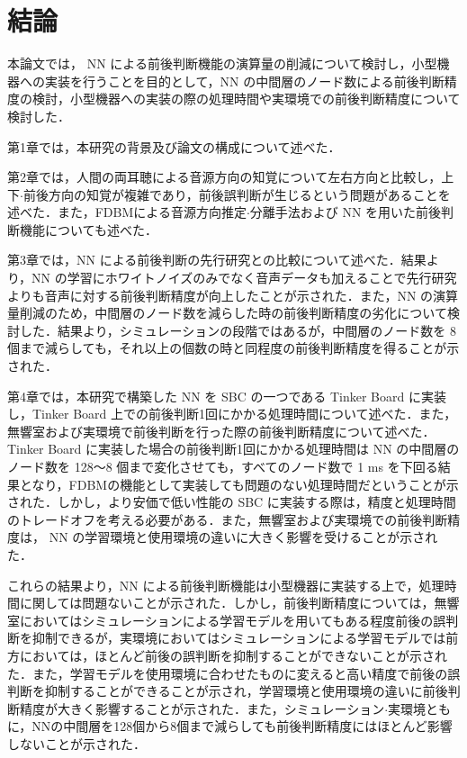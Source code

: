 ﻿\chapter{結論} \label{sec:conclusion}
本論文では， NN による前後判断機能の演算量の削減について検討し，小型機器への実装を行うことを目的として，NN の中間層のノード数による前後判断精度の検討，小型機器への実装の際の処理時間や実環境での前後判断精度について検討した．

第1章では，本研究の背景及び論文の構成について述べた．

第2章では，人間の両耳聴による音源方向の知覚について左右方向と比較し，上下$\cdot$前後方向の知覚が複雑であり，前後誤判断が生じるという問題があることを述べた．また，FDBMによる音源方向推定$\cdot$分離手法および NN を用いた前後判断機能についても述べた．

第3章では，NN による前後判断の先行研究との比較について述べた．結果より，NN の学習にホワイトノイズのみでなく音声データも加えることで先行研究よりも音声に対する前後判断精度が向上したことが示された．また，NN の演算量削減のため，中間層のノード数を減らした時の前後判断精度の劣化について検討した．結果より，シミュレーションの段階ではあるが，中間層のノード数を 8 個まで減らしても，それ以上の個数の時と同程度の前後判断精度を得ることが示された．

第4章では，本研究で構築した NN を SBC の一つである Tinker Board に実装し，Tinker Board 上での前後判断1回にかかる処理時間について述べた．また，無響室および実環境で前後判断を行った際の前後判断精度について述べた．Tinker Board に実装した場合の前後判断1回にかかる処理時間は NN の中間層のノード数を 128〜8 個まで変化させても，すべてのノード数で 1 ms を下回る結果となり，FDBMの機能として実装しても問題のない処理時間だということが示された．しかし，より安価で低い性能の SBC に実装する際は，精度と処理時間のトレードオフを考える必要がある．また，無響室および実環境での前後判断精度は， NN の学習環境と使用環境の違いに大きく影響を受けることが示された．

これらの結果より，NN による前後判断機能は小型機器に実装する上で，処理時間に関しては問題ないことが示された．しかし，前後判断精度については，無響室においてはシミュレーションによる学習モデルを用いてもある程度前後の誤判断を抑制できるが，実環境においてはシミュレーションによる学習モデルでは前方においては，ほとんど前後の誤判断を抑制することができないことが示された．また，学習モデルを使用環境に合わせたものに変えると高い精度で前後の誤判断を抑制することができることが示され，学習環境と使用環境の違いに前後判断精度が大きく影響することが示された．また，シミュレーション$\cdot$実環境ともに，NNの中間層を128個から8個まで減らしても前後判断精度にはほとんど影響しないことが示された．

